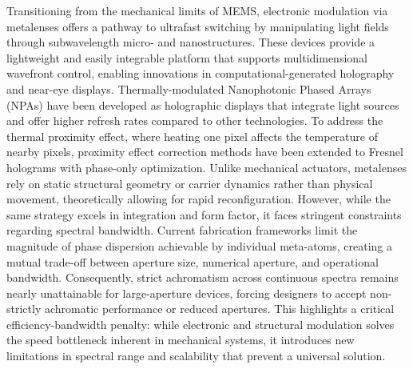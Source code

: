 Transitioning from the mechanical limits of MEMS, electronic modulation via metalenses offers a pathway to ultrafast switching by manipulating light fields through subwavelength micro- and nanostructures. These devices provide a lightweight and easily integrable platform that supports multidimensional wavefront control, enabling innovations in computational-generated holography and near-eye displays. Thermally-modulated Nanophotonic Phased Arrays (NPAs) have been developed as holographic displays that integrate light sources and offer higher refresh rates compared to other technologies. To address the thermal proximity effect, where heating one pixel affects the temperature of nearby pixels, proximity effect correction methods have been extended to Fresnel holograms with phase-only optimization. \citep{doi_10_1109_vr50410_2021_00058_601721f7} Unlike mechanical actuators, metalenses rely on static structural geometry or carrier dynamics rather than physical movement, theoretically allowing for rapid reconfiguration. However, while the same strategy excels in integration and form factor, it faces stringent constraints regarding spectral bandwidth. Current fabrication frameworks limit the magnitude of phase dispersion achievable by individual meta-atoms, creating a mutual trade-off between aperture size, numerical aperture, and operational bandwidth. Consequently, strict achromatism across continuous spectra remains nearly unattainable for large-aperture devices, forcing designers to accept non-strictly achromatic performance or reduced apertures. This highlights a critical efficiency-bandwidth penalty: while electronic and structural modulation solves the speed bottleneck inherent in mechanical systems, it introduces new limitations in spectral range and scalability that prevent a universal solution. \citep{doi_10_1038_s41377_026_02272_y_42e58df2}


